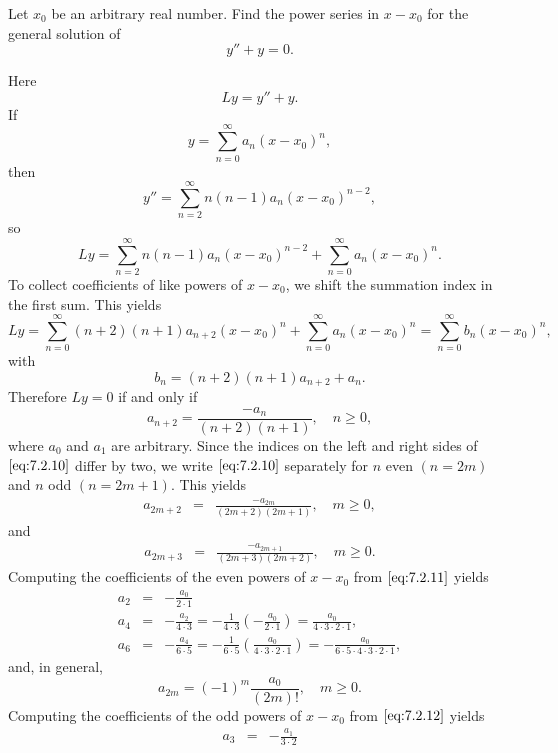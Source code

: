 \documentclass{ximera}
\begin{document}
\begin{example}\label{example:7.2.1}
Let $x_0$ be an arbitrary real number. Find the power series in
$x-x_0$ for the general solution of
\begin{equation}\label{eq:7.2.9}
 y''+ y=0.
\end{equation}
\begin{explanation}
Here
$$
Ly=y''+y.
$$
If
$$
y=\sum_{n=0}^\infty a_n(x-x_0)^n,
$$
then
$$
y''=\sum_{n=2}^\infty n(n-1)a_n(x-x_0)^{n-2},
$$
so
$$
Ly=\sum_{n=2}^\infty n(n-1)a_n(x-x_0)^{n-2}+\sum_{n=0}^\infty a_n(x-x_0)^n.
$$
To collect coefficients of like powers of $x-x_0$, we shift the summation
index in the first sum. This yields
$$
Ly=\sum^\infty_{n=0}(n+2)(n+1)a_{n+2}(x-x_0)^n +
 \sum^\infty_{n=0}a_n(x-x_0)^n
=\sum^\infty_{n=0}b_n(x-x_0)^n,
$$
with
$$
b_n=(n+2)(n+1)a_{n+2}+a_n.
$$
Therefore $Ly=0$ if and only if
\begin{equation}\label{eq:7.2.10}
a_{n+2}=\frac{-a_n}{(n+2)(n+1)},\quad n\geq0,
\end{equation}
where $a_0$ and $a_1$ are arbitrary. Since the indices on the left and
right sides of $\eqref{eq:7.2.10}$ differ by two, we write $\eqref{eq:7.2.10}$
separately for $n$ even $(n=2m)$ and $n$ odd $(n=2m+1)$. This yields
\begin{eqnarray}
a_{2m+2}&=&\frac{-a_{2m}}{(2m+2)(2m+1)},\quad m\geq0,
\label{eq:7.2.11} 
\end{eqnarray}
and
\begin{eqnarray}
a_{2m+3}&=&\frac{-a_{2m+1}}{(2m+3)(2m+2)},\quad  m\geq0.
\label{eq:7.2.12}
\end{eqnarray}
Computing the coefficients of the even powers of $x-x_0$ from
$\eqref{eq:7.2.11}$ yields
\begin{eqnarray*}
a_2&=&-\frac{a_0}{2\cdot1}\\
a_4&=&-\frac{a_2}{4\cdot3}=-\frac{1}{4\cdot3}
 \left(-\frac{a_0}{2\cdot1}\right)=
 \frac{a_0}{4\cdot3\cdot2\cdot1}, \\
a_6&=&-\frac{a_4}{6\cdot5}=-\frac{1}{6\cdot5}
 \left(\frac{a_0}{4\cdot3\cdot2\cdot1}\right)
=-\frac{a_0}{6\cdot5\cdot4\cdot3\cdot
 2\cdot1},
\end{eqnarray*}
and, in general,
\begin{equation}\label{eq:7.2.13}
a_{2m}=(-1)^m \frac{a_0}{(2m)!}   ,\quad  m\geq0.
\end{equation}
Computing the coefficients of the odd powers of $x-x_0$ from $\eqref{eq:7.2.12}$
yields
\begin{eqnarray*}
a_3&=&-\frac{a_1}{3\cdot2}\\

\end{eqnarray*}
\end{explanation}
\end{example}
\end{document}
